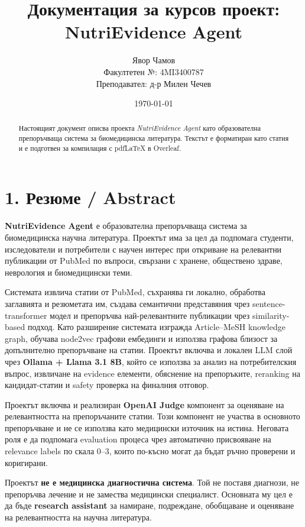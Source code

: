 \documentclass[12pt,a4paper]{article}
\title{\textbf{Документация за курсов проект: NutriEvidence Agent}}
\author{
Явор Чамов\\
\small{Факултетен №: 4MI3400787}\\[0.5em]
\small{Преподавател: д-р Милен Чечев}
}
\date{\today}
\begin{document}
\maketitle

\begin{abstract}
Настоящият документ описва проекта \textit{NutriEvidence Agent} като образователна препоръчваща система за биомедицинска литература. Текстът е форматиран като статия и е подготвен за компилация с pdfLaTeX в Overleaf.
\end{abstract}

\tableofcontents
\newpage

\section{1. Резюме / Abstract}\label{ux440ux435ux437ux44eux43cux435-ux430ux431ux441ux442ux440ux430ux43aux442}

\textbf{NutriEvidence Agent} е образователна препоръчваща система за биомедицинска научна литература. Проектът има за цел да подпомага студенти, изследователи и потребители с научен интерес при откриване на релевантни публикации от PubMed по въпроси, свързани с хранене, обществено здраве, неврология и биомедицински теми.

Системата извлича статии от PubMed, съхранява ги локално, обработва заглавията и резюметата им, създава семантични представяния чрез sentence-transformer модел и препоръчва най-релевантните публикации чрез similarity-based подход. Като разширение системата изгражда Article--MeSH knowledge graph, обучава node2vec графови ембединги и използва графова близост за допълнително препоръчване на статии. Проектът включва и локален LLM слой чрез \textbf{Ollama + Llama 3.1 8B}, който се използва за анализ на потребителския въпрос, извличане на evidence елементи, обяснение на препоръките, reranking на кандидат-статии и safety проверка на финалния отговор.

Проектът включва и реализиран \textbf{OpenAI Judge} компонент за оценяване на релевантността на препоръчаните статии. Този компонент не участва в основното препоръчване и не се използва като медицински източник на истина. Неговата роля е да подпомага evaluation процеса чрез автоматично присвояване на relevance labels по скала 0--3, които по-късно могат да бъдат ръчно проверени и коригирани.

Проектът \textbf{не е медицинска диагностична система}. Той не поставя диагнози, не препоръчва лечение и не замества медицински специалист. Основната му цел е да бъде \textbf{research assistant} за намиране, подреждане, обобщаване и оценяване на релевантността на научна литература.
\end{document}
